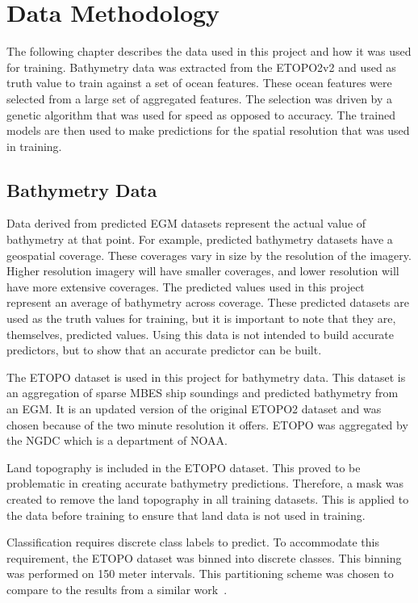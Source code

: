 \section{Data Methodology}
\setlength{\parindent}{10ex}
The following chapter describes the data used in this project and how it was used for training.
Bathymetry data was extracted from the \ac{ETOPO}2v2 and used as truth value to train against a set of ocean features.
These ocean features were selected from a large set of aggregated features.
The selection was driven by a genetic algorithm that was used for speed as opposed to accuracy.
The trained models are then used to make predictions for the spatial resolution that was used in training.

\subsection{Bathymetry Data}
Data derived from predicted \ac{EGM} datasets represent the actual value of bathymetry at that point.
For example, predicted bathymetry datasets have a geospatial coverage.
These coverages vary in size by the resolution of the imagery.
Higher resolution imagery will have smaller coverages, and lower resolution will have more extensive coverages.
The predicted values used in this project represent an average of bathymetry across coverage. 
These predicted datasets are used as the truth values for training, but it is important to note that they are, themselves, predicted values.
Using this data is not intended to build accurate predictors, but to show that an accurate predictor can be built.

\par
The \ac{ETOPO} dataset is used in this project for bathymetry data.
This dataset is an aggregation of sparse \ac{MBES} ship soundings and predicted bathymetry from an \ac{EGM}.
It is an updated version of the original ETOPO2 dataset and was chosen because of the two minute resolution it offers.
\ac{ETOPO} was aggregated by the \ac{NGDC} which is a department of \ac{NOAA}.

\par
Land topography is included in the \ac{ETOPO} dataset.
This proved to be problematic in creating accurate bathymetry predictions.
Therefore, a mask was created to remove the land topography in all training datasets.
This is applied to the data before training to ensure that land data is not used in training.

\par
Classification requires discrete class labels to predict.
To accommodate this requirement, the \ac{ETOPO} dataset was binned into discrete classes.
This binning was performed on 150 meter intervals.
This partitioning scheme was chosen to compare to the results from a similar work~\cite{jena2012prediction}.

